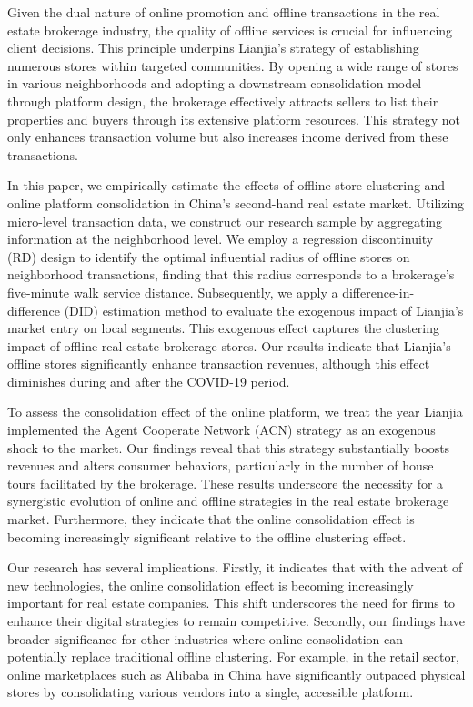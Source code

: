 \documentclass[12pt]{article}
\begin{document}
Given the dual nature of online promotion and offline transactions in the real estate brokerage industry, the quality of offline services is crucial for influencing client decisions. This principle underpins Lianjia's strategy of establishing numerous stores within targeted communities. By opening a wide range of stores in various neighborhoods and adopting a downstream consolidation model through platform design, the brokerage effectively attracts sellers to list their properties and buyers through its extensive platform resources. This strategy not only enhances transaction volume but also increases income derived from these transactions.

In this paper, we empirically estimate the effects of offline store clustering and online platform consolidation in China's second-hand real estate market. Utilizing micro-level transaction data, we construct our research sample by aggregating information at the neighborhood level. We employ a regression discontinuity (RD) design to identify the optimal influential radius of offline stores on neighborhood transactions, finding that this radius corresponds to a brokerage's five-minute walk service distance. Subsequently, we apply a difference-in-difference (DID) estimation method to evaluate the exogenous impact of Lianjia's market entry on local segments. This exogenous effect captures the clustering impact of offline real estate brokerage stores. Our results indicate that Lianjia's offline stores significantly enhance transaction revenues, although this effect diminishes during and after the COVID-19 period.

To assess the consolidation effect of the online platform, we treat the year Lianjia implemented the Agent Cooperate Network (ACN) strategy as an exogenous shock to the market. Our findings reveal that this strategy substantially boosts revenues and alters consumer behaviors, particularly in the number of house tours facilitated by the brokerage. These results underscore the necessity for a synergistic evolution of online and offline strategies in the real estate brokerage market. Furthermore, they indicate that the online consolidation effect is becoming increasingly significant relative to the offline clustering effect.

Our research has several implications. Firstly, it indicates that with the advent of new technologies, the online consolidation effect is becoming increasingly important for real estate companies. This shift underscores the need for firms to enhance their digital strategies to remain competitive. Secondly, our findings have broader significance for other industries where online consolidation can potentially replace traditional offline clustering. For example, in the retail sector, online marketplaces such as Alibaba in China have significantly outpaced physical stores by consolidating various vendors into a single, accessible platform.
\end{document}
